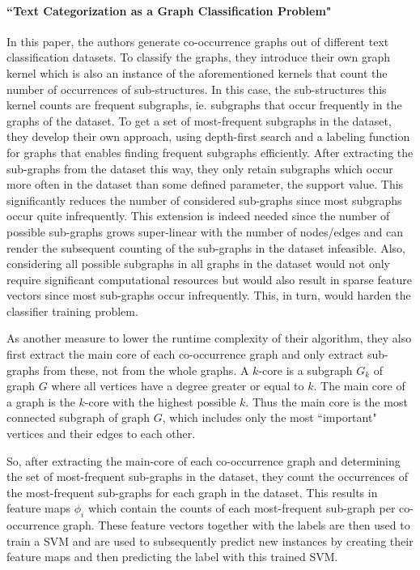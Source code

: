 \paragraph{``Text Categorization as a Graph Classification Problem" \cite{Rousseau2015a}}
In this paper, the authors generate co-occurrence graphs out of different text classification datasets.
To classify the graphs, they introduce their own graph kernel which is also an instance of the aforementioned kernels that count the number of occurrences of sub-structures.
In this case, the sub-structures this kernel counts are frequent subgraphs, ie. subgraphs that occur frequently in the graphs of the dataset.
To get a set of most-frequent subgraphs in the dataset, they develop their own approach, using depth-first search and a labeling function for graphs that enables finding frequent subgraphs efficiently.
After extracting the sub-graphs from the dataset this way, they only retain subgraphs which occur more often in the dataset than some defined parameter, the support value.
This significantly reduces the number of considered sub-graphs since most subgraphs occur quite infrequently.
This extension is indeed needed since the number of possible sub-graphs grows super-linear with the number of nodes/edges and can render the subsequent counting of the sub-graphs in the dataset infeasible.
Also, considering all possible subgraphs in all graphs in the dataset would not only require significant computational resources but would also result in sparse feature vectors since most sub-graphs occur infrequently.
This, in turn, would harden the classifier training problem.

As another measure to lower the runtime complexity of their algorithm, they also first extract the main core of each co-occurrence graph and only extract sub-graphs from these, not from the whole graphs.
A $k$-core is a subgraph $G_k$ of graph $G$ where all vertices have a degree greater or equal to $k$. The main core of a graph is the $k$-core with the highest possible $k$.
Thus the main core is the most connected subgraph of graph $G$, which includes only the most ``important" vertices and their edges to each other.

So, after extracting the main-core of each co-occurrence graph and determining the set of most-frequent sub-graphs in the dataset, they count the occurrences of the most-frequent sub-graphs for each graph in the dataset.
This results in feature maps $\phi_i$ which contain the counts of each most-frequent sub-graph per co-occurrence graph.
These feature vectors together with the labels are then used to train a SVM and are used to subsequently predict new instances by creating their feature maps and then predicting the label with this trained SVM.

